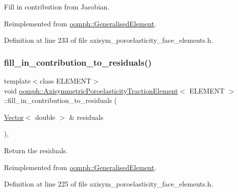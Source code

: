 Fill in contribution from Jacobian. 



Reimplemented from \hyperlink{classoomph_1_1GeneralisedElement_a6ae09fc0d68e4309ac1b03583d252845}{oomph\+::\+Generalised\+Element}.



Definition at line 233 of file axisym\+\_\+poroelasticity\+\_\+face\+\_\+elements.\+h.

\mbox{\label{classoomph_1_1AxisymmetricPoroelasticityTractionElement_a0db1a4eba81137b3740fcbd7bc705f48}} 
\subsubsection{\texorpdfstring{fill\+\_\+in\+\_\+contribution\+\_\+to\+\_\+residuals()}{fill\_in\_contribution\_to\_residuals()}}
{\footnotesize\ttfamily template$<$class E\+L\+E\+M\+E\+NT$>$ \\
void \hyperlink{classoomph_1_1AxisymmetricPoroelasticityTractionElement}{oomph\+::\+Axisymmetric\+Poroelasticity\+Traction\+Element}$<$ E\+L\+E\+M\+E\+NT $>$\+::fill\+\_\+in\+\_\+contribution\+\_\+to\+\_\+residuals (\begin{DoxyParamCaption}\item[{\hyperlink{classoomph_1_1Vector}{Vector}$<$ double $>$ \&}]{residuals }\end{DoxyParamCaption})\hspace{0.3cm}{\ttfamily [inline]}, {\ttfamily [virtual]}}



Return the residuals. 



Reimplemented from \hyperlink{classoomph_1_1GeneralisedElement_a310c97f515e8504a48179c0e72c550d7}{oomph\+::\+Generalised\+Element}.



Definition at line 225 of file axisym\+\_\+poroelasticity\+\_\+face\+\_\+elements.\+h.

